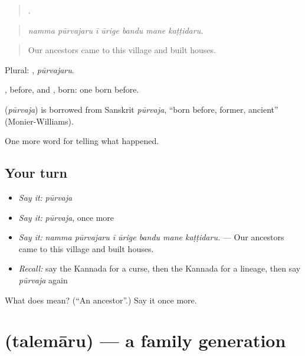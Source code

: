 \begin{quote}
      .
\end{quote}

\begin{quote}
\emph{namma pūrvajaru ī ūrige bandu mane kaṭṭidaru.}
\end{quote}

\begin{quote}
Our ancestors came to this village and built houses.
\end{quote}

Plural: , \emph{pūrvajaru}.

, before, and , born: one born before.

\begin{cousinweb}
\textbf{} (\emph{pūrvaja}) is borrowed from Sanskrit \emph{pūrvaja}, \textquotedblleft{}born before, former, ancient\textquotedblright{} (Monier-Williams).
\end{cousinweb}

\begin{grammarlens}[title={What you've built}]
One more word for telling what happened.
\end{grammarlens}

\subsection*{Your turn}
\begin{itemize}
\raggedright
  \item \emph{Say it:} \emph{pūrvaja}
  \item \emph{Say it:} \emph{pūrvaja}, once more
  \item \emph{Say it:} \emph{namma pūrvajaru ī ūrige bandu mane kaṭṭidaru.} — Our ancestors came to this village and built houses.
  \item \emph{Recall:} say the Kannada for a curse, then the Kannada for a lineage, then say \emph{pūrvaja} again
\end{itemize}

\begin{tcolorbox}[breakable,colback=teal!4,colframe=teal!35!black,title={Before you move on}]
What does  mean? (\textquotedblleft{}An ancestor\textquotedblright{}.) Say it once more.
\end{tcolorbox}
\section[\texorpdfstring{\kn{ತಲೆಮಾರು} (talemāru)}{ತಲೆಮಾರು (talemāru)}]{ (talemāru) — a family generation}

